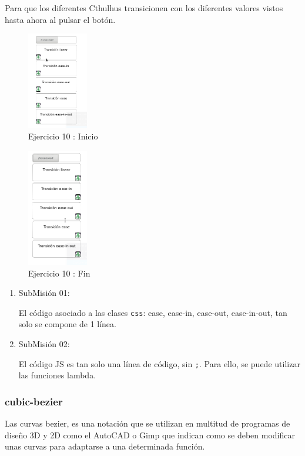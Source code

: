 \documentclass[11pt]{article}
\begin{document}
Para que los diferentes Cthulhus transicionen con los diferentes valores
vistos hasta ahora al pulsar el botón.

\begin{figure}[!h]
\centering
\includegraphics[width=100px]{./imgs/Tarea_10_1.png}
\caption{\label{fig:Tarea10_1}Ejercicio 10 : Inicio}
\end{figure}

\begin{figure}[!h]
\centering
\includegraphics[width=100px]{./imgs/Tarea_10_2.png}
\caption{\label{fig:Tarea10_2}Ejercicio 10 : Fin}
\end{figure}

\begin{enumerate}
\item SubMisión 01:
\label{sec-1-2-7-1}

El código asociado a las clases \verb~css~: ease, ease-in, ease-out,
ease-in-out, tan solo se compone de 1 línea.

\item SubMisión 02:
\label{sec-1-2-7-2}

El código JS es tan solo una línea de código, sin \verb~;~. Para ello, se puede
utilizar las funciones lambda.
\end{enumerate}


\subsubsection{cubic-bezier}
\label{sec-1-2-8}

Las curvas bezier, es una notación que se utilizan en multitud de programas
de diseño 3D y 2D como el AutoCAD o Gimp que indican como se deben modificar
unas curvas para adaptarse a una determinada función.
\end{document}
